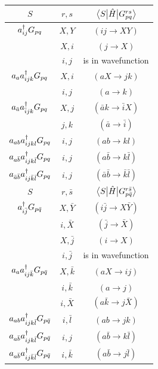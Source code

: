 \documentclass[./thesis.tex]{subfiles}
\begin{document}
\begin{table} 
	\begin{tabular}{ c|c|c }
		\hline \hline \rule{0pt}{3ex}
		$S$									&$ r, s$ 	& $\mel{S}{\hat{H}}{G_{pq}^{rs}}$	\\
		\hline \hline \rule{0pt}{3ex}
		$a^\dagger_{ij} G_{pq}$						& $X,Y$ 	&$(ij \rightarrow XY)$		\\
											& $X,i$ 	&$(j \rightarrow X)$		\\
											& $i,j$ 	&is in wavefunction			\\
		\hline \rule{0pt}{3ex}
		$a_{a} a^\dagger_{ijk} G_{pq}$				&$X,i$		&$(aX \rightarrow jk)$		\\
											&$i,j$		&$(a \rightarrow k)$		\\
		\hline \rule{0pt}{3ex}
		$a_{\bar a} a^\dagger_{\bar i jk} G_{pq}$	&$X,j$		&$(\bar a k \rightarrow \bar i X)$		\\
											&$j,k$		&$(\bar a \rightarrow \bar i)$		\\
		\hline \rule{0pt}{3ex}
		$a_{ab} a^\dagger_{ijkl} G_{pq}$			&$i,j$		&$(ab \rightarrow kl)$		\\
		\hline \rule{0pt}{3ex}
		$a_{a  \bar b} a^\dagger_{ijk \bar l} G_{pq}$			&$i,j$		&$(a \bar b \rightarrow k \bar l)$		\\
		\hline \rule{0pt}{3ex}
		$a_{\bar a \bar b} a^\dagger_{i j \bar k \bar l} G_{pq}$	&$i,j$		&$(\bar a \bar b \rightarrow \bar k \bar l)$		\\
		
		\hline \hline \rule{0pt}{3ex}
		$S$									&$ r, \bar s$ 	& $\mel{S}{\hat{H}}{G_{p \bar q}^{r \bar s}}$	\\
		\hline \hline \rule{0pt}{3ex}
		$a^\dagger_{i \bar j} G_{p \bar q}$				& $X, \bar Y$ 	&$(i \bar j \rightarrow X \bar Y)$		\\
											& $i,\bar X$ 		&$(\bar j \rightarrow \bar X)$		\\
											& $X,\bar j$ 	&$(i \rightarrow X)$		\\
											& $i,\bar j$ 	&is in wavefunction			\\
											
											
		\hline \rule{0pt}{3ex}
		$a_{a} a^\dagger_{ij \bar k} G_{p \bar q}$		&$X,\bar k$		&$(aX \rightarrow ij)$		\\
											&$i,\bar k$		&$(a \rightarrow j)$		\\
											&$i,\bar X$		&$(a \bar k \rightarrow j \bar X)$		\\
											
		\hline \rule{0pt}{3ex}
		$a_{ab} a^\dagger_{ijk \bar l} G_{p \bar q}$			&$i,\bar l$		&$(ab \rightarrow jk)$		\\
		\hline \rule{0pt}{3ex}
		$a_{a  \bar b} a^\dagger_{ijk \bar l} G_{p \bar q}$			&$i,j$		&$(a \bar b \rightarrow k \bar l)$		\\
		\hline \rule{0pt}{3ex}
		$a_{a  \bar b} a^\dagger_{ij \bar k \bar l} G_{p \bar q}$			&$i,\bar k$		&$(a \bar b \rightarrow j \bar l)$		\\
	\end{tabular}
\end{table}
\end{document}
